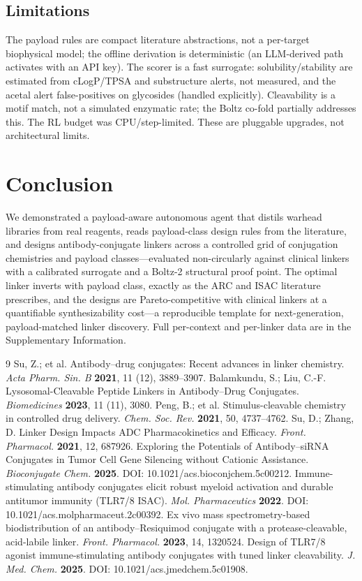\documentclass[10pt]{article}
\begin{document}
\subsection{Limitations}
The payload rules are compact literature abstractions, not a per-target biophysical model; the offline derivation is deterministic (an LLM-derived path activates with an API key). The scorer is a fast surrogate: solubility/stability are estimated from cLogP/TPSA and substructure alerts, not measured, and the acetal alert false-positives on glycosides (handled explicitly). Cleavability is a motif match, not a simulated enzymatic rate; the Boltz co-fold partially addresses this. The RL budget was CPU/step-limited. These are pluggable upgrades, not architectural limits.
\section{Conclusion}
We demonstrated a payload-aware autonomous agent that distils warhead libraries from real reagents, reads payload-class design rules from the literature, and designs antibody-conjugate linkers across a controlled grid of conjugation chemistries and payload classes---evaluated non-circularly against clinical linkers with a calibrated surrogate and a Boltz-2 structural proof point. The optimal linker inverts with payload class, exactly as the ARC and ISAC literature prescribes, and the designs are Pareto-competitive with clinical linkers at a quantifiable synthesizability cost---a reproducible template for next-generation, payload-matched linker discovery. Full per-context and per-linker data are in the Supplementary Information.
\begin{thebibliography}{9}
 Su, Z.; et al. Antibody--drug conjugates: Recent advances in linker chemistry. \emph{Acta Pharm. Sin. B} \textbf{2021}, 11 (12), 3889--3907.
 Balamkundu, S.; Liu, C.-F. Lysosomal-Cleavable Peptide Linkers in Antibody--Drug Conjugates. \emph{Biomedicines} \textbf{2023}, 11 (11), 3080.
 Peng, B.; et al. Stimulus-cleavable chemistry in controlled drug delivery. \emph{Chem. Soc. Rev.} \textbf{2021}, 50, 4737--4762.
 Su, D.; Zhang, D. Linker Design Impacts ADC Pharmacokinetics and Efficacy. \emph{Front. Pharmacol.} \textbf{2021}, 12, 687926.
 Exploring the Potentials of Antibody--siRNA Conjugates in Tumor Cell Gene Silencing without Cationic Assistance. \emph{Bioconjugate Chem.} \textbf{2025}. DOI: 10.1021/acs.bioconjchem.5c00212.
 Immune-stimulating antibody conjugates elicit robust myeloid activation and durable antitumor immunity (TLR7/8 ISAC). \emph{Mol. Pharmaceutics} \textbf{2022}. DOI: 10.1021/acs.molpharmaceut.2c00392.
 Ex vivo mass spectrometry-based biodistribution of an antibody--Resiquimod conjugate with a protease-cleavable, acid-labile linker. \emph{Front. Pharmacol.} \textbf{2023}, 14, 1320524.
 Design of TLR7/8 agonist immune-stimulating antibody conjugates with tuned linker cleavability. \emph{J. Med. Chem.} \textbf{2025}. DOI: 10.1021/acs.jmedchem.5c01908.
\end{thebibliography}
\end{document}
